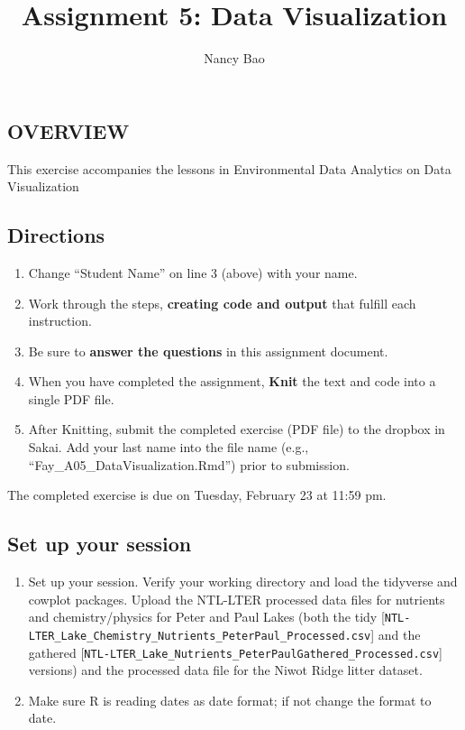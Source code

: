 \documentclass[
]{article}
\title{Assignment 5: Data Visualization}
\author{Nancy Bao}
\date{}
\providecommand{\tightlist}{%
  \setlength{\itemsep}{0pt}\setlength{\parskip}{0pt}}
\begin{document}
\maketitle

\hypertarget{overview}{%
\subsection{OVERVIEW}\label{overview}}

This exercise accompanies the lessons in Environmental Data Analytics on
Data Visualization

\hypertarget{directions}{%
\subsection{Directions}\label{directions}}

\begin{enumerate}
\def\labelenumi{\arabic{enumi}.}
\tightlist
\item
  Change ``Student Name'' on line 3 (above) with your name.
\item
  Work through the steps, \textbf{creating code and output} that fulfill
  each instruction.
\item
  Be sure to \textbf{answer the questions} in this assignment document.
\item
  When you have completed the assignment, \textbf{Knit} the text and
  code into a single PDF file.
\item
  After Knitting, submit the completed exercise (PDF file) to the
  dropbox in Sakai. Add your last name into the file name (e.g.,
  ``Fay\_A05\_DataVisualization.Rmd'') prior to submission.
\end{enumerate}

The completed exercise is due on Tuesday, February 23 at 11:59 pm.

\hypertarget{set-up-your-session}{%
\subsection{Set up your session}\label{set-up-your-session}}

\begin{enumerate}
\def\labelenumi{\arabic{enumi}.}
\item
  Set up your session. Verify your working directory and load the
  tidyverse and cowplot packages. Upload the NTL-LTER processed data
  files for nutrients and chemistry/physics for Peter and Paul Lakes
  (both the tidy
  {[}\texttt{NTL-LTER\_Lake\_Chemistry\_Nutrients\_PeterPaul\_Processed.csv}{]}
  and the gathered
  {[}\texttt{NTL-LTER\_Lake\_Nutrients\_PeterPaulGathered\_Processed.csv}{]}
  versions) and the processed data file for the Niwot Ridge litter
  dataset.
\item
  Make sure R is reading dates as date format; if not change the format
  to date.
\end{enumerate}
\end{document}
